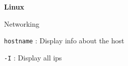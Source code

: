 \documentclass[10pt]{article}
\newcommand{\code}[1]{{\color{teal}\texttt{#1}}}
\newcommand{\cmd}[3][.3]{\code{#2} : #3 \\[#1em]}
\newcommand{\opts}[2][.5]{\hspace*{.5cm}\begin{minipage}{0.9\textwidth}
  #2
  \vspace*{-1em}
\end{minipage}\\[#1em]}
\newcommand{\opt}[2]{
  \code{#1} : #2 \\
}
\newcommand{\cluster}[2]{\begin{mybox}{#1}
  #2
  \vspace*{-1.3em}
\end{mybox}}
\newcommand{\mytitle}[1]{
  \begin{center}
    \begin{titlebox}
      {\large \textbf{#1}}
    \end{titlebox}
  \end{center}
  \vspace*{-1.8em}
}
\begin{document}
\mytitle{Linux}

\begin{multicols*}{2}

  \cluster{Networking}{
    \cmd{hostname}{Display info about the host}
    \opts{
      \opt{-I}{Display all ips}
    }
  }

\end{multicols*}
\end{document}
